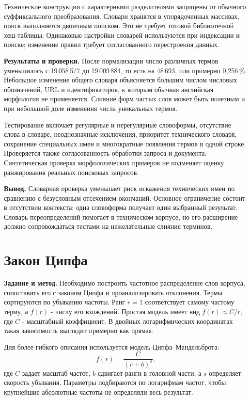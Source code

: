 \documentclass[pdf,unicode,12pt,a4paper,oneside,fleqn]{article}
\newcommand{\labsection}[2]{\par\Needspace{9\baselineskip}\setcounter{section}{\numexpr#1-1\relax}\section{#2}}
\newcommand{\partlabel}[1]{\par\Needspace{4\baselineskip}\medskip\textbf{#1.}\quad}
\begin{document}
Технические конструкции с характерными разделителями защищены от обычного
суффиксального преобразования. Словари хранятся в упорядоченных массивах,
поиск выполняется двоичным поиском. Это не требует готовой библиотечной
хеш-таблицы. Одинаковые настройки словарей используются при индексации
и поиске; изменение правил требует согласованного перестроения данных.

\partlabel{Результаты и проверки}
После нормализации число различных термов уменьшилось с 19\,058\,577
до 19\,009\,884, то есть на 48\,693, или примерно 0,256\,\%.
Небольшое изменение общего словаря объясняется большим числом числовых
обозначений, URL и идентификаторов, к которым обычная английская морфология
не применяется. Слияние форм частых слов может быть полезным и при небольшой
доле изменения числа уникальных термов.

Тестирование включает регулярные и нерегулярные словоформы, отсутствие слова
в словаре, неоднозначные исключения, приоритет технического словаря,
сохранение специальных имен и многократные появления термов в одной строке.
Проверяется также согласованность обработки запроса и документа. Синтетическая
проверка морфологических примеров не подменяет оценку ранжирования реальных
поисковых запросов.

\partlabel{Вывод}
Словарная проверка уменьшает риск искажения технических имен по сравнению
с безусловным отсечением окончаний. Основное ограничение состоит в отсутствии
контекста: одна словоформа получает один выбранный результат. Словарь
переопределений помогает в техническом корпусе, но его расширение должно
сопровождаться тестами на нежелательные слияния терминов.

\labsection{5}{Закон Ципфа}

\partlabel{Задание и метод}
Необходимо построить частотное распределение слов корпуса, сопоставить его
с законом Ципфа и проанализировать отклонения. Термы сортируются по убыванию
частоты. Ранг $r=1$ соответствует самому частому терму, а $f(r)$ - числу его
вхождений. Простая модель имеет вид $f(r)\approx C/r$, где $C$ - масштабный
коэффициент. В двойных логарифмических координатах такая зависимость выглядит
примерно как прямая.

Для более гибкого описания используется модель Ципфа--Мандельброта:
\[
 f(r)=\frac{C}{(r+b)^s},
\]
где $C$ задает масштаб частот, $b$ сдвигает ранги в головной части,
а $s$ определяет скорость убывания. Параметры подбираются по логарифмам частот,
чтобы крупнейшие абсолютные частоты не определяли весь результат.
\end{document}
